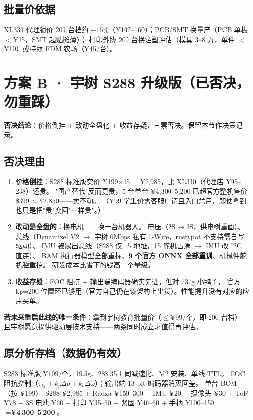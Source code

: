 \documentclass[11pt,a4paper]{ctexart}
\newcommand{\bad}[1]{\textcolor{red!75!black}{#1}}
\begin{document}
\subsection{批量价依据}
XL330 代理锁价 200 台档约 $-15\%$（¥102--160）；PCB/SMT 换量产（PCB 单板 $<$¥15，SMT 起贴摊薄）；
打印外协 200 台换注塑评估（模具 3--8 万，单件 $<$¥10）或持续 FDM 农场（¥45/台）。

\section{方案 B · 宇树 S288 升级版（已否决，勿重踩）}
\noindent\bad{\textbf{否决结论}：价格倒挂 + 改动全盘化 + 收益存疑，三票否决。保留本节作决策记录。}

\subsection{否决理由}
\begin{enumerate}[nosep,leftmargin=1.5em]
\item \textbf{价格倒挂}：S288 标准版实价 ¥199$\times$15 = ¥2,985，比 XL330（代理店 ¥95--238）\bad{还贵}。
"国产替代"反而更贵，5 台单台 ¥4,300--5,200 已超官方整机售价 \$399$\approx$¥2,850——卖不动。
（¥99 学生价需客服申请且入口禁用，即使拿到也只是把"贵"变回"一样贵"。）
\item \textbf{改动是全盘的}：换电机 $=$ 换一台机器人。
电压（2S$\to$3S，供电树重画）、总线（Dynamixel V2 $\to$ 宇树 6Mbps 私有 1-Wire，rustypot 不支持需自写驱动）、
IMU 被踢出总线（S288 仅 15 地址，15 舵机占满 $\to$ IMU 改 I2C 直连）、
BAM 执行器模型全部重标、\textbf{9 个官方 ONNX 全部重训}、机械件舵机腔重挖。
研发成本比省下的钱高一个量级。
\item \textbf{收益存疑}：FOC 阻抗 + 输出端编码器确实先进，但对 737g 小鸭子，
官方 kp=200 位置环已够用（官方自己仍在该架构上出货）。性能提升没有对应的应用买单。
\end{enumerate}
\noindent\textbf{若未来重启此线的唯一条件}：拿到宇树教育批量价（$\le$¥99/个，即 200 台档）
且宇树愿意提供驱动层技术支持——两条同时成立才值得再评估。

\subsection{原分析存档（数据仍有效）}
S288 标准版 ¥199/个，19.5g、288.35:1 同减速比、M2 安装、单线 TTL。
FOC 阻抗控制（$\tau_{ff}+k_p\Delta p+k_d\Delta\omega$）；输出端 13-bit 编码器消灭回差。
单台 BOM（按 ¥199）：S288 ¥2,985 + Radxa ¥150--300 + IMU ¥20 + 摄像头 ¥30 + ToF ¥78 +
3S 电池 ¥60 + 打印 ¥35--60 + 紧固 ¥40--60 + 手柄 ¥100--150 $= \textbf{¥4,300--5,200}$。
\end{document}
